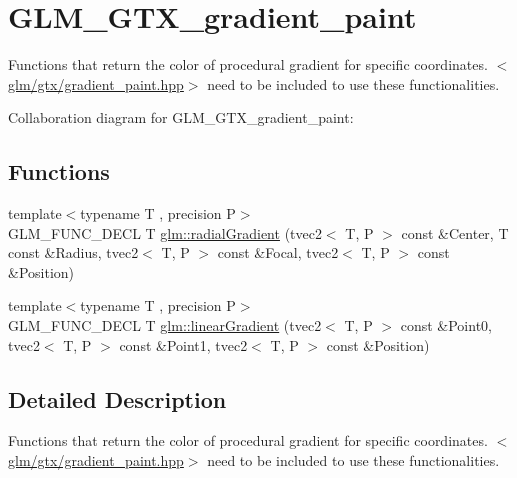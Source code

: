 \hypertarget{group__gtx__gradient__paint}{\section{G\-L\-M\-\_\-\-G\-T\-X\-\_\-gradient\-\_\-paint}
\label{group__gtx__gradient__paint}
}


Functions that return the color of procedural gradient for specific coordinates. $<$\hyperlink{gradient__paint_8hpp}{glm/gtx/gradient\-\_\-paint.\-hpp}$>$ need to be included to use these functionalities.  


Collaboration diagram for G\-L\-M\-\_\-\-G\-T\-X\-\_\-gradient\-\_\-paint\-:
\subsection*{Functions}
\begin{DoxyCompactItemize}
\item 
{\footnotesize template$<$typename T , precision P$>$ }\\G\-L\-M\-\_\-\-F\-U\-N\-C\-\_\-\-D\-E\-C\-L T \hyperlink{group__gtx__gradient__paint_ga166d43d567a4cf150579a92f69b0dc9f}{glm\-::radial\-Gradient} (tvec2$<$ T, P $>$ const \&Center, T const \&Radius, tvec2$<$ T, P $>$ const \&Focal, tvec2$<$ T, P $>$ const \&Position)
\item 
{\footnotesize template$<$typename T , precision P$>$ }\\G\-L\-M\-\_\-\-F\-U\-N\-C\-\_\-\-D\-E\-C\-L T \hyperlink{group__gtx__gradient__paint_gacde26d5e0c4a1856467bded9dfad9040}{glm\-::linear\-Gradient} (tvec2$<$ T, P $>$ const \&Point0, tvec2$<$ T, P $>$ const \&Point1, tvec2$<$ T, P $>$ const \&Position)
\end{DoxyCompactItemize}


\subsection{Detailed Description}
Functions that return the color of procedural gradient for specific coordinates. $<$\hyperlink{gradient__paint_8hpp}{glm/gtx/gradient\-\_\-paint.\-hpp}$>$ need to be included to use these functionalities. 

